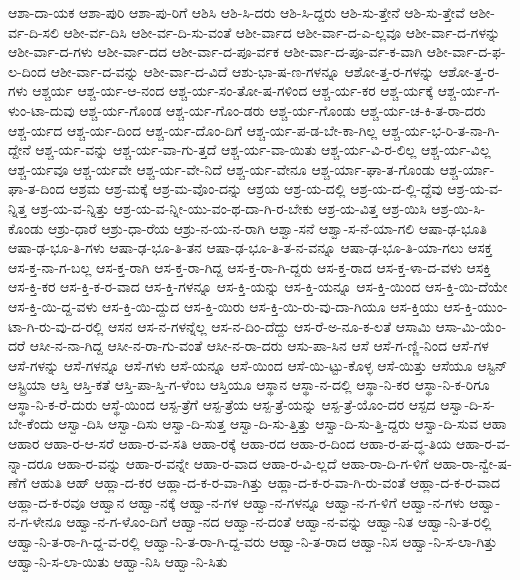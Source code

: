 {ಆಶಾ-ದಾ-ಯಕ
ಆಶಾ-ಪುರಿ
ಆಶಾ-ಪು-ರಿಗೆ
ಆಶಿಸಿ
ಆಶಿ-ಸಿ-ದರು
ಆಶಿ-ಸಿ-ದ್ದರು
ಆಶಿ-ಸು-ತ್ತೇನೆ
ಆಶಿ-ಸು-ತ್ತೇವೆ
ಆಶೀ-ರ್ವ-ದಿ-ಸಲಿ
ಆಶೀ-ರ್ವ-ದಿಸಿ
ಆಶೀ-ರ್ವ-ದಿ-ಸು-ವಂತೆ
ಆಶೀ-ರ್ವಾದ
ಆಶೀ-ರ್ವಾ-ದ-ಎ-ಲ್ಲವೂ
ಆಶೀ-ರ್ವಾ-ದ-ಗಳನ್ನು
ಆಶೀ-ರ್ವಾ-ದ-ಗಳು
ಆಶೀ-ರ್ವಾ-ದದ
ಆಶೀ-ರ್ವಾ-ದ-ಪೂ-ರ್ವಕ
ಆಶೀ-ರ್ವಾ-ದ-ಪೂ-ರ್ವ-ಕ-ವಾಗಿ
ಆಶೀ-ರ್ವಾ-ದ-ಫ-ಲ-ದಿಂದ
ಆಶೀ-ರ್ವಾ-ದ-ವನ್ನು
ಆಶೀ-ರ್ವಾ-ದ-ವಿದೆ
ಆಶು-ಭಾ-ಷ-ಣ-ಗಳನ್ನೂ
ಆಶೋ-ತ್ತ-ರ-ಗಳನ್ನು
ಆಶೋ-ತ್ತ-ರ-ಗಳು
ಆಶ್ಚರ್ಯ
ಆಶ್ಚ-ರ್ಯ-ಆ-ನಂದ
ಆಶ್ಚ-ರ್ಯ-ಸಂ-ತೋ-ಷ-ಗಳಿಂದ
ಆಶ್ಚ-ರ್ಯ-ಕರ
ಆಶ್ಚ-ರ್ಯಕ್ಕೆ
ಆಶ್ಚ-ರ್ಯ-ಗ-ಳುಂ-ಟಾ-ದುವು
ಆಶ್ಚ-ರ್ಯ-ಗೊಂಡ
ಆಶ್ಚ-ರ್ಯ-ಗೊಂ-ಡರು
ಆಶ್ಚ-ರ್ಯ-ಗೊಂಡು
ಆಶ್ಚ-ರ್ಯ-ಚ-ಕಿ-ತ-ರಾ-ದರು
ಆಶ್ಚ-ರ್ಯದ
ಆಶ್ಚ-ರ್ಯ-ದಿಂದ
ಆಶ್ಚ-ರ್ಯ-ದೊಂ-ದಿಗೆ
ಆಶ್ಚ-ರ್ಯ-ಪ-ಡ-ಬೇ-ಕಾ-ಗಿಲ್ಲ
ಆಶ್ಚ-ರ್ಯ-ಭ-ರಿ-ತ-ನಾ-ಗಿ-ದ್ದೇನೆ
ಆಶ್ಚ-ರ್ಯ-ವನ್ನು
ಆಶ್ಚ-ರ್ಯ-ವಾ-ಗು-ತ್ತದೆ
ಆಶ್ಚ-ರ್ಯ-ವಾ-ಯಿತು
ಆಶ್ಚ-ರ್ಯ-ವಿ-ರ-ಲಿಲ್ಲ
ಆಶ್ಚ-ರ್ಯ-ವಿಲ್ಲ
ಆಶ್ಚ-ರ್ಯವೂ
ಆಶ್ಚ-ರ್ಯವೇ
ಆಶ್ಚ-ರ್ಯ-ವೇ-ನಿದೆ
ಆಶ್ಚ-ರ್ಯ-ವೇನೂ
ಆಶ್ಚ-ರ್ಯಾ-ಘಾ-ತ-ಗೊಂಡು
ಆಶ್ಚ-ರ್ಯಾ-ಘಾ-ತ-ದಿಂದ
ಆಶ್ರಮ
ಆಶ್ರ-ಮಕ್ಕೆ
ಆಶ್ರ-ಮ-ವೊಂ-ದನ್ನು
ಆಶ್ರಯ
ಆಶ್ರ-ಯ-ದಲ್ಲಿ
ಆಶ್ರ-ಯ-ದ-ಲ್ಲಿ-ದ್ದೆವು
ಆಶ್ರ-ಯ-ವ-ನ್ನಿತ್ತ
ಆಶ್ರ-ಯ-ವ-ನ್ನಿತ್ತು
ಆಶ್ರ-ಯ-ವ-ನ್ನೀ-ಯು-ವಂ-ಥ-ದಾ-ಗಿ-ರ-ಬೇಕು
ಆಶ್ರ-ಯ-ವಿತ್ತ
ಆಶ್ರ-ಯಿಸಿ
ಆಶ್ರ-ಯಿ-ಸಿ-ಕೊಂಡು
ಆಶ್ರು-ಧಾರೆ
ಆಶ್ರು-ಧಾ-ರೆಯ
ಆಶ್ರು-ನ-ಯ-ನ-ರಾಗಿ
ಆಶ್ವಾ-ಸನೆ
ಆಶ್ವಾ-ಸ-ನೆ-ಯಾ-ಗಲಿ
ಆಷಾ-ಢ-ಭೂತಿ
ಆಷಾ-ಢ-ಭೂ-ತಿ-ಗಳು
ಆಷಾ-ಢ-ಭೂ-ತಿ-ತನ
ಆಷಾ-ಢ-ಭೂ-ತಿ-ತ-ನ-ವನ್ನೂ
ಆಷಾ-ಢ-ಭೂ-ತಿ-ಯಾ-ಗಲು
ಆಸಕ್ತ
ಆಸ-ಕ್ತ-ನಾ-ಗ-ಬಲ್ಲ
ಆಸ-ಕ್ತ-ರಾಗಿ
ಆಸ-ಕ್ತ-ರಾ-ಗಿದ್ದ
ಆಸ-ಕ್ತ-ರಾ-ಗಿ-ದ್ದರು
ಆಸ-ಕ್ತ-ರಾದ
ಆಸ-ಕ್ತ-ಳಾ-ದ-ವಳು
ಆಸಕ್ತಿ
ಆಸ-ಕ್ತಿ-ಕರ
ಆಸ-ಕ್ತಿ-ಕ-ರ-ವಾದ
ಆಸ-ಕ್ತಿ-ಗಳನ್ನೂ
ಆಸ-ಕ್ತಿ-ಯನ್ನು
ಆಸ-ಕ್ತಿ-ಯನ್ನೂ
ಆಸ-ಕ್ತಿ-ಯಿಂದ
ಆಸ-ಕ್ತಿ-ಯಿ-ದೆಯೇ
ಆಸ-ಕ್ತಿ-ಯಿ-ದ್ದ-ವಳು
ಆಸ-ಕ್ತಿ-ಯಿ-ದ್ದುದ
ಆಸ-ಕ್ತಿ-ಯಿರು
ಆಸ-ಕ್ತಿ-ಯಿ-ರು-ವು-ದಾ-ಗಿಯೂ
ಆಸ-ಕ್ತಿಯು
ಆಸ-ಕ್ತಿ-ಯುಂ-ಟಾ-ಗಿ-ರು-ವು-ದ-ರಲ್ಲಿ
ಆಸನ
ಆಸ-ನ-ಗಳನ್ನೆಲ್ಲ
ಆಸ-ನ-ದಿಂ-ದೆದ್ದು
ಆಸ-ರೆ-ಅ-ನೂ-ಕ-ಲತೆ
ಆಸಾಮಿ
ಆಸಾ-ಮಿ-ಯೆಂ-ದರೆ
ಆಸೀ-ನ-ನಾ-ಗಿದ್ದ
ಆಸೀ-ನ-ರಾ-ಗು-ವಂತೆ
ಆಸೀ-ನ-ರಾ-ದರು
ಆಸು-ಪಾ-ಸಿನ
ಆಸೆ
ಆಸೆ-ಗ-ಣ್ಣಿ-ನಿಂದ
ಆಸೆ-ಗಳ
ಆಸೆ-ಗಳನ್ನು
ಆಸೆ-ಗಳನ್ನೂ
ಆಸೆ-ಗಳು
ಆಸೆ-ಯನ್ನೂ
ಆಸೆ-ಯಿಂದ
ಆಸೆ-ಯಿ-ಟ್ಟು-ಕೊಳ್ಳ
ಆಸೆ-ಯಿತ್ತು
ಆಸೆಯೂ
ಆಸ್ಟಿನ್
ಆಸ್ಟ್ರಿಯಾ
ಆಸ್ತಿ
ಆಸ್ತಿ-ಕತೆ
ಆಸ್ತಿ-ಪಾ-ಸ್ತಿ-ಗ-ಳೆಂಬ
ಆಸ್ತಿಯೂ
ಆಸ್ಥಾನ
ಆಸ್ಥಾ-ನ-ದಲ್ಲಿ
ಆಸ್ಥಾ-ನಿ-ಕರ
ಆಸ್ಥಾ-ನಿ-ಕ-ರಿಗೂ
ಆಸ್ಥಾ-ನಿ-ಕ-ರೆ-ದುರು
ಆಸ್ಥೆ-ಯಿಂದ
ಆಸ್ಪ-ತ್ರೆಗೆ
ಆಸ್ಪ-ತ್ರೆಯ
ಆಸ್ಪ-ತ್ರೆ-ಯನ್ನು
ಆಸ್ಪ-ತ್ರೆ-ಯೊಂ-ದರ
ಆಸ್ಪದ
ಆಸ್ವಾ-ದಿ-ಸ-ಬೇ-ಕೆಂದು
ಆಸ್ವಾ-ದಿಸಿ
ಆಸ್ವಾ-ದಿಸು
ಆಸ್ವಾ-ದಿ-ಸುತ್ತ
ಆಸ್ವಾ-ದಿ-ಸು-ತ್ತಿತ್ತು
ಆಸ್ವಾ-ದಿ-ಸು-ತ್ತಿ-ದ್ದರು
ಆಸ್ವಾ-ದಿ-ಸುವ
ಆಹಾ
ಆಹಾರ
ಆಹಾ-ರ-ಆ-ಸರೆ
ಆಹಾ-ರ-ವ-ಸತಿ
ಆಹಾ-ರಕ್ಕೆ
ಆಹಾ-ರದ
ಆಹಾ-ರ-ದಿಂದ
ಆಹಾ-ರ-ಪ-ದ್ಧ-ತಿಯ
ಆಹಾ-ರ-ವ-ನ್ನಾ-ದರೂ
ಆಹಾ-ರ-ವನ್ನು
ಆಹಾ-ರ-ವನ್ನೇ
ಆಹಾ-ರ-ವಾದ
ಆಹಾ-ರ-ವಿ-ಲ್ಲದೆ
ಆಹಾ-ರಾ-ದಿ-ಗ-ಳಿಗೆ
ಆಹಾ-ರಾ-ನ್ವೇ-ಷ-ಣೆಗೆ
ಆಹುತಿ
ಆಹ್
ಆಹ್ಲಾ-ದ-ಕರ
ಆಹ್ಲಾ-ದ-ಕ-ರ-ವಾ-ಗಿತ್ತು
ಆಹ್ಲಾ-ದ-ಕ-ರ-ವಾ-ಗಿ-ರು-ವಂತೆ
ಆಹ್ಲಾ-ದ-ಕ-ರ-ವಾದ
ಆಹ್ಲಾ-ದ-ಕ-ರವೂ
ಆಹ್ವಾನ
ಆಹ್ವಾ-ನಕ್ಕೆ
ಆಹ್ವಾ-ನ-ಗಳ
ಆಹ್ವಾ-ನ-ಗಳನ್ನೂ
ಆಹ್ವಾ-ನ-ಗ-ಳಿಗೆ
ಆಹ್ವಾ-ನ-ಗಳು
ಆಹ್ವಾ-ನ-ಗ-ಳೇನೂ
ಆಹ್ವಾ-ನ-ಗ-ಳೊಂ-ದಿಗೆ
ಆಹ್ವಾ-ನದ
ಆಹ್ವಾ-ನ-ದಂತೆ
ಆಹ್ವಾ-ನ-ವನ್ನು
ಆಹ್ವಾ-ನಿತ
ಆಹ್ವಾ-ನಿ-ತ-ರಲ್ಲಿ
ಆಹ್ವಾ-ನಿ-ತ-ರಾ-ಗಿ-ದ್ದ-ವ-ರಲ್ಲಿ
ಆಹ್ವಾ-ನಿ-ತ-ರಾ-ಗಿ-ದ್ದ-ವರು
ಆಹ್ವಾ-ನಿ-ತ-ರಾದ
ಆಹ್ವಾ-ನಿಸ
ಆಹ್ವಾ-ನಿ-ಸ-ಲಾ-ಗಿತ್ತು
ಆಹ್ವಾ-ನಿ-ಸ-ಲಾ-ಯಿತು
ಆಹ್ವಾ-ನಿಸಿ
ಆಹ್ವಾ-ನಿ-ಸಿತು
}
